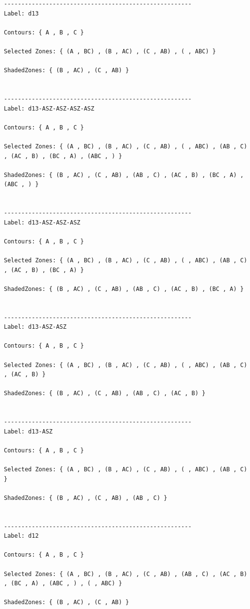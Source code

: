 \documentclass[10pt, a4paper, titlepage]{article}
\begin{document}
\small
\begin{lstlisting}
------------------------------------------------------
Label: d13

Contours: { A , B , C } 

Selected Zones: { (A , BC) , (B , AC) , (C , AB) , ( , ABC) }  

ShadedZones: { (B , AC) , (C , AB) } 


------------------------------------------------------
Label: d13-ASZ-ASZ-ASZ-ASZ

Contours: { A , B , C } 

Selected Zones: { (A , BC) , (B , AC) , (C , AB) , ( , ABC) , (AB , C) , (AC , B) , (BC , A) , (ABC , ) }  

ShadedZones: { (B , AC) , (C , AB) , (AB , C) , (AC , B) , (BC , A) , (ABC , ) } 


------------------------------------------------------
Label: d13-ASZ-ASZ-ASZ

Contours: { A , B , C } 

Selected Zones: { (A , BC) , (B , AC) , (C , AB) , ( , ABC) , (AB , C) , (AC , B) , (BC , A) }  

ShadedZones: { (B , AC) , (C , AB) , (AB , C) , (AC , B) , (BC , A) } 


------------------------------------------------------
Label: d13-ASZ-ASZ

Contours: { A , B , C } 

Selected Zones: { (A , BC) , (B , AC) , (C , AB) , ( , ABC) , (AB , C) , (AC , B) }  

ShadedZones: { (B , AC) , (C , AB) , (AB , C) , (AC , B) } 


------------------------------------------------------
Label: d13-ASZ

Contours: { A , B , C } 

Selected Zones: { (A , BC) , (B , AC) , (C , AB) , ( , ABC) , (AB , C) }  

ShadedZones: { (B , AC) , (C , AB) , (AB , C) } 


------------------------------------------------------
Label: d12

Contours: { A , B , C } 

Selected Zones: { (A , BC) , (B , AC) , (C , AB) , (AB , C) , (AC , B) , (BC , A) , (ABC , ) , ( , ABC) }  

ShadedZones: { (B , AC) , (C , AB) } 
\end{lstlisting}
\large
\end{document}
